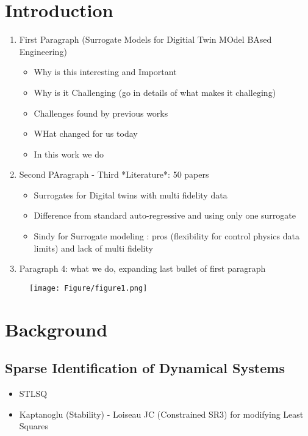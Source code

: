 \documentclass[final,3p,10.5pt]{elsarticle}
\begin{document}
\section{Introduction}
\begin{enumerate}
    \item First Paragraph (Surrogate Models for Digitial Twin MOdel BAsed Engineering)
        \begin{itemize}
            \item Why is this interesting and Important
            \item Why is it Challenging (go in details of what makes it challeging)
            \item Challenges found by previous works
            \item WHat changed for us today
            \item In this work we do
        \end{itemize}
    \item Second PAragraph - Third *Literature*: 50 papers
    \begin{itemize}
        \item Surrogates for Digital twins with multi fidelity data
        \item Difference from standard auto-regressive and using only one surrogate 
        \item Sindy for Surrogate modeling : pros (flexibility for control physics data limits) and lack of multi fidelity
    \end{itemize}
    \item Paragraph 4: what we do, expanding last bullet of first paragraph
\end{enumerate}

\begin{figure}
    \texttt{[image: Figure/figure1.png]}
\end{figure}

\section{Background}
\subsection{Sparse Identification of Dynamical Systems}
\begin{itemize}
    \item STLSQ
    \item Kaptanoglu (Stability) - Loiseau JC (Constrained SR3) for modifying Least Squares
\end{itemize}
\end{document}
